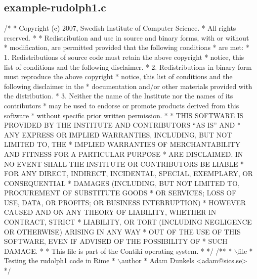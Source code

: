 \hypertarget{a00028}{}\subsection{example-\/rudolph1.\+c}

\begin{DoxyCodeInclude}
\textcolor{comment}{/*}
\textcolor{comment}{ * Copyright (c) 2007, Swedish Institute of Computer Science.}
\textcolor{comment}{ * All rights reserved.}
\textcolor{comment}{ *}
\textcolor{comment}{ * Redistribution and use in source and binary forms, with or without}
\textcolor{comment}{ * modification, are permitted provided that the following conditions}
\textcolor{comment}{ * are met:}
\textcolor{comment}{ * 1. Redistributions of source code must retain the above copyright}
\textcolor{comment}{ *    notice, this list of conditions and the following disclaimer.}
\textcolor{comment}{ * 2. Redistributions in binary form must reproduce the above copyright}
\textcolor{comment}{ *    notice, this list of conditions and the following disclaimer in the}
\textcolor{comment}{ *    documentation and/or other materials provided with the distribution.}
\textcolor{comment}{ * 3. Neither the name of the Institute nor the names of its contributors}
\textcolor{comment}{ *    may be used to endorse or promote products derived from this software}
\textcolor{comment}{ *    without specific prior written permission.}
\textcolor{comment}{ *}
\textcolor{comment}{ * THIS SOFTWARE IS PROVIDED BY THE INSTITUTE AND CONTRIBUTORS ``AS IS'' AND}
\textcolor{comment}{ * ANY EXPRESS OR IMPLIED WARRANTIES, INCLUDING, BUT NOT LIMITED TO, THE}
\textcolor{comment}{ * IMPLIED WARRANTIES OF MERCHANTABILITY AND FITNESS FOR A PARTICULAR PURPOSE}
\textcolor{comment}{ * ARE DISCLAIMED.  IN NO EVENT SHALL THE INSTITUTE OR CONTRIBUTORS BE LIABLE}
\textcolor{comment}{ * FOR ANY DIRECT, INDIRECT, INCIDENTAL, SPECIAL, EXEMPLARY, OR CONSEQUENTIAL}
\textcolor{comment}{ * DAMAGES (INCLUDING, BUT NOT LIMITED TO, PROCUREMENT OF SUBSTITUTE GOODS}
\textcolor{comment}{ * OR SERVICES; LOSS OF USE, DATA, OR PROFITS; OR BUSINESS INTERRUPTION)}
\textcolor{comment}{ * HOWEVER CAUSED AND ON ANY THEORY OF LIABILITY, WHETHER IN CONTRACT, STRICT}
\textcolor{comment}{ * LIABILITY, OR TORT (INCLUDING NEGLIGENCE OR OTHERWISE) ARISING IN ANY WAY}
\textcolor{comment}{ * OUT OF THE USE OF THIS SOFTWARE, EVEN IF ADVISED OF THE POSSIBILITY OF}
\textcolor{comment}{ * SUCH DAMAGE.}
\textcolor{comment}{ *}
\textcolor{comment}{ * This file is part of the Contiki operating system.}
\textcolor{comment}{ *}
\textcolor{comment}{ */}
\textcolor{comment}{}
\textcolor{comment}{/**}
\textcolor{comment}{ * \(\backslash\)file}
\textcolor{comment}{ *         Testing the rudolph1 code in Rime}
\textcolor{comment}{ * \(\backslash\)author}
\textcolor{comment}{ *         Adam Dunkels <adam@sics.se>}
\textcolor{comment}{ */}


\end{DoxyCodeInclude}
